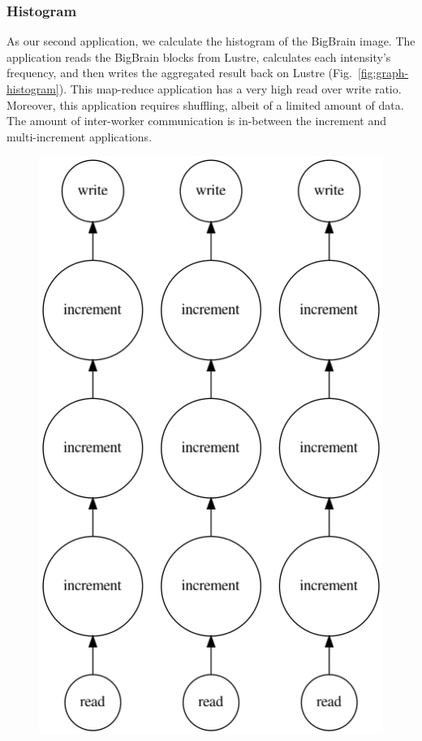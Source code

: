 \documentclass[AMA,STIX1COL]{WileyNJD-v2}
\begin{document}
\subsubsection{Histogram}
As our second application, we calculate the histogram of the BigBrain image. 
The application reads the BigBrain blocks from Lustre, calculates each intensity's frequency, and then writes the aggregated result back on Lustre (Fig.~\ref{fig:graph-histogram}).
This map-reduce application has a very high read over write ratio.
Moreover, this application requires shuffling, albeit of a limited amount of data. 
The amount of inter-worker communication is in-between the increment and multi-increment applications.
								
\begin{figure}[h]
	\centering
	\begin{minipage}{0.4\textwidth}
		\centering
		\includegraphics[width=\linewidth]{figures/increment.png}

\end{minipage}
\end{figure}
\end{document}

